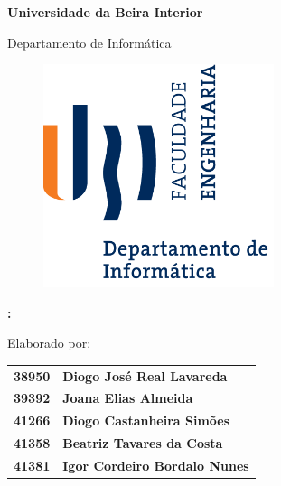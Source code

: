 \thispagestyle{empty}
\setcounter{page}{-1}

\begin{center}
\begin{Huge}
\textbf{Universidade da Beira Interior}
\end{Huge}
\end{center}

\begin{center}
\begin{Huge}
Departamento de Informática
\end{Huge}
\end{center}

\vspace{0,07cm}
\begin{figure}[!htb]
\centering
\includegraphics[width=191pt]{ubi-fe-di.png}
\end{figure}

\vspace{0.5cm}
\begin{center}
\begin{Large}
\textbf{\theteam: \appname}
\end{Large}
\end{center}

\vspace{0.5cm}
\begin{center}
\begin{normalsize}
\begin{large}
Elaborado por:
\end{large}
\end{normalsize}
\end{center}

\vspace{0.2cm}
\begin{center}
\begin{large}
\begin{tabular}{>{\bfseries}r @{~~---~~} >{\bfseries}l}
	38950 & Diogo José Real Lavareda    \\
	39392 & Joana Elias Almeida         \\
	41266 & Diogo Castanheira Simões    \\
	41358 & Beatriz Tavares da Costa    \\
	41381 & Igor Cordeiro Bordalo Nunes
\end{tabular}
\end{large}
\end{center}

